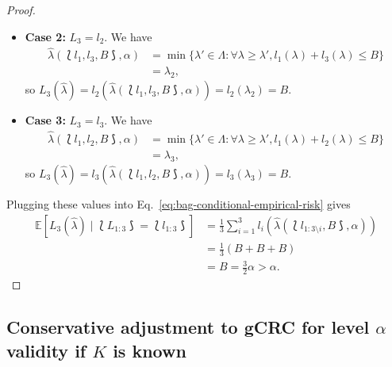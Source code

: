 \begin{proof}
\begin{itemize}
\begin{align}
        & = \lambda_1,
    \end{align}
    so $L_3(\hat{\lambda}) = l_1(\hat{\lambda}(\lbag l_2, l_3, B \rbag, \alpha)) = l_1(\lambda_1) = B$.
    \item \textbf{Case 2:} $L_3 = l_2$. We have
    \begin{align}
        \hat{\lambda}(\lbag l_1, l_3, B \rbag, \alpha) & = \min \{\lambda' \in \Lambda : \forall \lambda \geq \lambda', l_1(\lambda) + l_3(\lambda) \leq B\} \\
        & = \lambda_2,
    \end{align}
    so $L_3(\hat{\lambda}) = l_2(\hat{\lambda}(\lbag l_1, l_3, B \rbag, \alpha)) = l_2(\lambda_2) = B$.
    \item \textbf{Case 3:} $L_3 = l_3$. We have
    \begin{align}
        \hat{\lambda}(\lbag l_1, l_2, B \rbag, \alpha) & = \min \{\lambda' \in \Lambda : \forall \lambda \geq \lambda', l_1(\lambda) + l_2(\lambda) \leq B\} \\
        & = \lambda_3,
    \end{align}
    so $L_3(\hat{\lambda}) = l_3(\hat{\lambda}(\lbag l_1, l_2, B \rbag, \alpha)) = l_3(\lambda_3) = B$.
\end{itemize}
Plugging these values into Eq.~\eqref{eq:bag-conditional-empirical-risk} gives
\begin{align*}
    \mathbb{E}[L_3(\hat{\lambda}) \mid \lbag L_{1:3}\rbag = \lbag l_{1:3}\rbag] & = \frac{1}{3}\sum_{i =1}^{3} l_i(\hat{\lambda}(\lbag l_{1:3\setminus i}, B \rbag, \alpha)) \\
    & = \frac{1}{3}(B + B + B) \\
    & = B = \frac{3}{2}\alpha > \alpha.
\end{align*}

\end{proof}

\subsection{Conservative adjustment to gCRC for level $\alpha$ validity if $K$ is known}
\label{app:conservative_adjustment_K_known}

